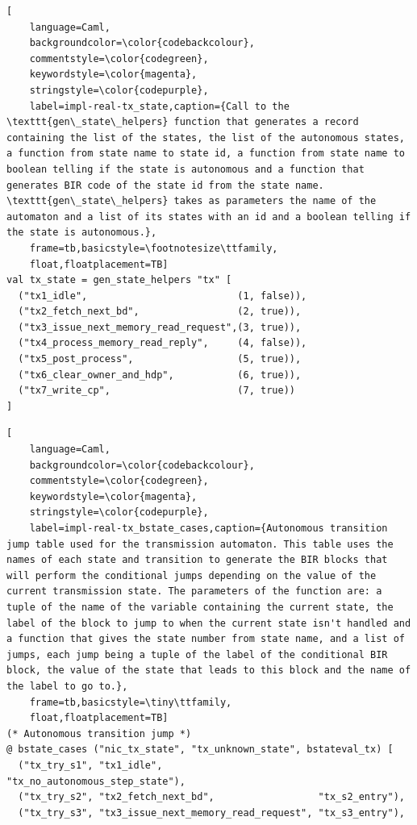 \documentclass{kththesis}
\begin{document}
{\begin{lstlisting}[
    language=Caml,
    backgroundcolor=\color{codebackcolour},
    commentstyle=\color{codegreen},
    keywordstyle=\color{magenta},
    stringstyle=\color{codepurple},
    label=impl-real-tx_state,caption={Call to the \texttt{gen\_state\_helpers} function that generates a record containing the list of the states, the list of the autonomous states, a function from state name to state id, a function from state name to boolean telling if the state is autonomous and a function that generates BIR code of the state id from the state name. \texttt{gen\_state\_helpers} takes as parameters the name of the automaton and a list of its states with an id and a boolean telling if the state is autonomous.},
    frame=tb,basicstyle=\footnotesize\ttfamily,
    float,floatplacement=TB]
val tx_state = gen_state_helpers "tx" [
  ("tx1_idle",                          (1, false)),
  ("tx2_fetch_next_bd",                 (2, true)),
  ("tx3_issue_next_memory_read_request",(3, true)),
  ("tx4_process_memory_read_reply",     (4, false)),
  ("tx5_post_process",                  (5, true)),
  ("tx6_clear_owner_and_hdp",           (6, true)),
  ("tx7_write_cp",                      (7, true))
]
\end{lstlisting}
\begin{lstlisting}[
    language=Caml,
    backgroundcolor=\color{codebackcolour},
    commentstyle=\color{codegreen},
    keywordstyle=\color{magenta},
    stringstyle=\color{codepurple},
    label=impl-real-tx_bstate_cases,caption={Autonomous transition jump table used for the transmission automaton. This table uses the names of each state and transition to generate the BIR blocks that will perform the conditional jumps depending on the value of the current transmission state. The parameters of the function are: a tuple of the name of the variable containing the current state, the label of the block to jump to when the current state isn't handled and a function that gives the state number from state name, and a list of jumps, each jump being a tuple of the label of the conditional BIR block, the value of the state that leads to this block and the name of the label to go to.},
    frame=tb,basicstyle=\tiny\ttfamily,
    float,floatplacement=TB]
(* Autonomous transition jump *)
@ bstate_cases ("nic_tx_state", "tx_unknown_state", bstateval_tx) [
  ("tx_try_s1", "tx1_idle",                           "tx_no_autonomous_step_state"),
  ("tx_try_s2", "tx2_fetch_next_bd",                  "tx_s2_entry"),
  ("tx_try_s3", "tx3_issue_next_memory_read_request", "tx_s3_entry"),

\end{lstlisting}}
\end{document}
